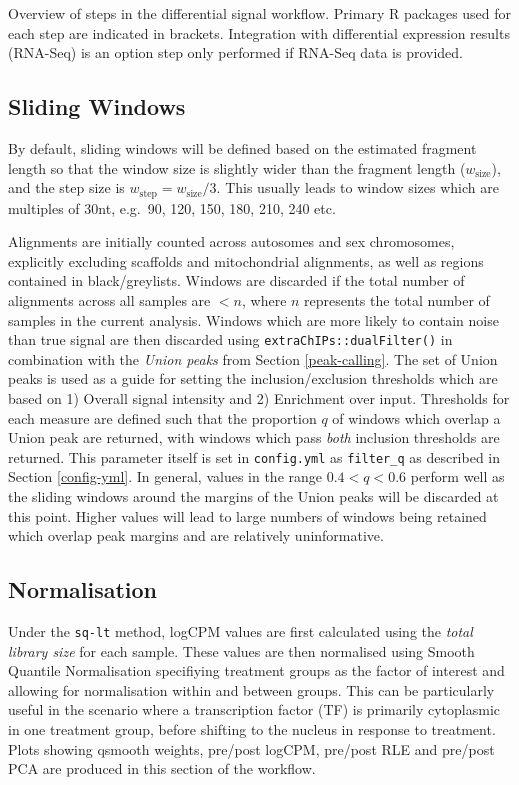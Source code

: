 \documentclass[
]{book}
\begin{document}
\label{fig:unnamed-chunk-4}Overview of steps in the differential signal workflow. Primary R packages used for each step are indicated in brackets. Integration with differential expression results (RNA-Seq) is an option step only performed if RNA-Seq data is provided.

\hypertarget{sliding-windows}{%
\subsection*{Sliding Windows}\label{sliding-windows}}

By default, sliding windows will be defined based on the estimated fragment length so that the window size is slightly wider than the fragment length (\(w_\text{size}\)), and the step size is \(w_\text{step} = w_\text{size} / 3\).
This usually leads to window sizes which are multiples of 30nt, e.g.~90, 120, 150, 180, 210, 240 etc.

Alignments are initially counted across autosomes and sex chromosomes, explicitly excluding scaffolds and mitochondrial alignments, as well as regions contained in black/greylists.
Windows are discarded if the total number of alignments across all samples are \(<n\), where \(n\) represents the total number of samples in the current analysis.
Windows which are more likely to contain noise than true signal are then discarded using \texttt{extraChIPs::dualFilter()} in combination with the \emph{Union peaks} from Section \ref{peak-calling}.
The set of Union peaks is used as a guide for setting the inclusion/exclusion thresholds which are based on 1) Overall signal intensity and 2) Enrichment over input.
Thresholds for each measure are defined such that the proportion \(q\) of windows which overlap a Union peak are returned, with windows which pass \emph{both} inclusion thresholds are returned.
This parameter itself is set in \texttt{config.yml} as \texttt{filter\_q} as described in Section \ref{config-yml}.
In general, values in the range \(0.4 < q < 0.6\) perform well as the sliding windows around the margins of the Union peaks will be discarded at this point.
Higher values will lead to large numbers of windows being retained which overlap peak margins and are relatively uninformative.

\hypertarget{normalisation}{%
\subsection*{Normalisation}\label{normalisation}}

Under the \texttt{sq-lt} method, logCPM values are first calculated using the \emph{total library size} for each sample.
These values are then normalised using Smooth Quantile Normalisation\citep{qsmooth} specifiying treatment groups as the factor of interest and allowing for normalisation within and between groups.
This can be particularly useful in the scenario where a transcription factor (TF) is primarily cytoplasmic in one treatment group, before shifting to the nucleus in response to treatment.
Plots showing qsmooth weights, pre/post logCPM, pre/post RLE \citep{rle} and pre/post PCA are produced in this section of the workflow.
\end{document}
